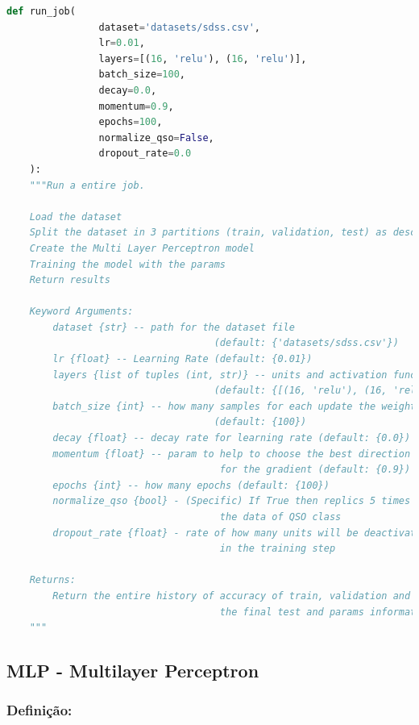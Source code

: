 \begin{lstlisting}[language=Python]
def run_job(
                dataset='datasets/sdss.csv',
                lr=0.01,
                layers=[(16, 'relu'), (16, 'relu')],
                batch_size=100,
                decay=0.0,
                momentum=0.9,
                epochs=100,
                normalize_qso=False,
                dropout_rate=0.0
    ):
    """Run a entire job.

    Load the dataset
    Split the dataset in 3 partitions (train, validation, test) as describe in documentation
    Create the Multi Layer Perceptron model
    Training the model with the params
    Return results
    
    Keyword Arguments:
        dataset {str} -- path for the dataset file
                                    (default: {'datasets/sdss.csv'})
        lr {float} -- Learning Rate (default: {0.01})
        layers {list of tuples (int, str)} -- units and activation function
                                    (default: {[(16, 'relu'), (16, 'relu')]})
        batch_size {int} -- how many samples for each update the weights
                                    (default: {100})
        decay {float} -- decay rate for learning rate (default: {0.0})
        momentum {float} -- param to help to choose the best direction
                                     for the gradient (default: {0.9})
        epochs {int} -- how many epochs (default: {100})
        normalize_qso {bool} - (Specific) If True then replics 5 times
                                     the data of QSO class
        dropout_rate {float} - rate of how many units will be deactivate
                                     in the training step
    
    Returns:
        Return the entire history of accuracy of train, validation and
                                     the final test and params information
    """
\end{lstlisting}


\subsection{MLP - Multilayer Perceptron}

\subsubsection*{\textbf{Definição}:}

